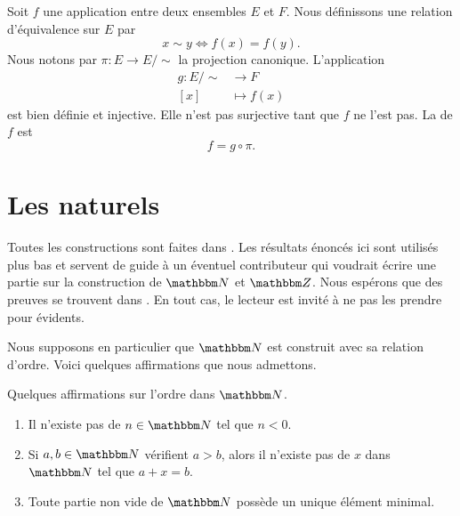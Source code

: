 \begin{example}
Soit \( f\) une application entre deux ensembles \( E\) et \( F\). Nous définissons une relation d'équivalence sur \( E\) par
\begin{equation}
    x\sim y\Leftrightarrow f(x)=f(y).
\end{equation}
Nous notons par \( \pi\colon E\to E/\sim\) la projection canonique. L'application
\begin{equation}
    \begin{aligned}
        g\colon E/\sim&\to F \\
        [x]&\mapsto f(x)
    \end{aligned}
\end{equation}
est bien définie et injective. Elle n'est pas surjective tant que \( f\) ne l'est pas. La  de \( f\) est
\begin{equation}
    f=g\circ\pi.
\end{equation}
\end{example}

\section{Les naturels}
\label{SECooPJSYooNYaIaq}

Toutes les constructions sont faites dans \cite{RWWJooJdjxEK}. Les résultats énoncés ici sont utilisés plus bas et servent de guide à un éventuel contributeur qui voudrait écrire une partie sur la construction de \( \eN\) et \( \eZ\). Nous espérons que des preuves se trouvent dans \cite{RWWJooJdjxEK}. En tout cas, le lecteur est invité à ne pas les prendre pour évidents.

Nous supposons en particulier que \( \eN\) est construit avec sa relation d'ordre. Voici quelques affirmations que nous admettons.

\begin{lemma}       \label{LEMooYMRJooYIAhBb} \label{LEMooFHEOooSHPGgU}
    Quelques affirmations sur l'ordre dans \( \eN\).
    \begin{enumerate}
        \item
            Il n'existe pas de \( n\in \eN\) tel que \( n<0\).
        \item
            Si \( a,b\in \eN\) vérifient \( a>b\), alors il n'existe pas de \( x\) dans \( \eN\) tel que \( a+x=b\).
        \item       \label{ITEMooNHRIooODBVNK}
            Toute partie non vide de \( \eN\) possède un unique élément minimal.
    \end{enumerate}
\end{lemma}

